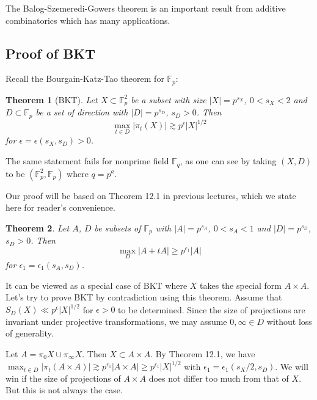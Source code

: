 \documentclass[12pt]{amsart}
\newtheorem{theorem}{Theorem}[section]
\begin{document}
The Balog-Szemeredi-Gowers theorem is an important result from additive combinatorics which has many applications.

\subsection{Proof of BKT}

Recall the Bourgain-Katz-Tao theorem for $\mathbb{F}_p$: 

\begin{theorem}[BKT]
    Let $X \subset \mathbb{F}_p^2$ be a subset with size $|X| = p^{s_X}$, $0 < s_X < 2$ and $D \subset \mathbb{F}_p$ be a set of direction with $|D| = p^{s_D}$, $s_D > 0$. Then 
    \begin{equation*}
        \max_{t \in D} |\pi_t(X)| \gtrsim p^{\epsilon} |X|^{1/2} 
    \end{equation*}
    for $\epsilon = \epsilon(s_X, s_D) > 0$. 
\end{theorem}

The same statement fails for nonprime field $\mathbb{F}_q$, as one can see by taking $(X,D)$ to be $(\mathbb{F}_p^2, \mathbb{F}_p)$ where $q = p^a$. 

Our proof will be based on Theorem 12.1 in previous lectures, which we state here for reader's convenience. 

\begin{theorem}
    Let $A$, $D$ be subsets of $\mathbb{F}_p$ with $|A| = p^{s_A}$, $0 < s_A< 1$ and $|D| = p^{s_D}$, $s_D > 0$. Then
    \begin{equation*}
        \max_D |A+tA| \ge p^{\epsilon_1}|A|
    \end{equation*}
    for $\epsilon_1 = \epsilon_1(s_A, s_D)$.
\end{theorem}

It can be viewed as a special case of BKT where $X$ takes the special form  $A \times A$. Let's try to prove BKT by contradiction using this theorem. Assume that $S_D(X) \ll p^{\epsilon} |X|^{1/2}$ for $\epsilon > 0$ to be determined. Since the size of projections are invariant under projective transformations, we may assume $0,\infty \in D$ without loss of generality. 

Let $A = \pi_0X \cup \pi_\infty X$. Then $X \subset A \times A$. By Theorem 12.1, we have $\max_{t \in D} |\pi_t (A \times A)| \gtrsim p^{\epsilon_1}|A \times A| \ge p^{\epsilon_1} |X|^{1/2}$ with $\epsilon_1 = \epsilon_1(s_X/2, s_D)$. We will win if the size of projections of $A \times A$ does not differ too much from that of $X$. But this is not always the case. 
\end{document}
